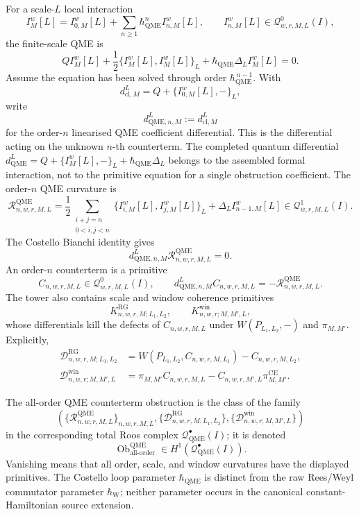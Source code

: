 \begin{defn}
For a scale-\(L\) local interaction
\[
  I^w_M[L]
  =
  I^w_{0,M}[L]
  +\sum_{n\ge1}\hbar_{\mathrm{QME}}^n I^w_{n,M}[L],
  \qquad
  I^w_{n,M}[L]\in\mathcal Q^0_{w,r,M,L}(I),
\]
the finite-scale QME is
\[
  QI^w_M[L]
  +\frac12\{I^w_M[L],I^w_M[L]\}_L
  +\hbar_{\mathrm{QME}}\Delta_LI^w_M[L]=0 .
\]
Assume the equation has been solved through order
\(\hbar_{\mathrm{QME}}^{\,n-1}\).  With
\[
  d^{L}_{\mathrm{cl},M}
  =
  Q+\{I^w_{0,M}[L],-\}_L ,
\]
write
\[
  d^{L}_{\mathrm{QME},n,M}:=d^{L}_{\mathrm{cl},M}
\]
for the order-\(n\) linearised QME coefficient differential.  This is
the differential acting on the unknown \(n\)-th counterterm.  The
completed quantum differential
\(d_{\mathrm{QME}}^{L}=Q+\{I^w_M[L],-\}_L+\hbar_{\mathrm{QME}}\Delta_L\)
belongs to the assembled formal interaction, not to the primitive
equation for a single obstruction coefficient.
The order-\(n\) QME curvature is
\[
  \mathcal R^{\mathrm{QME}}_{n,w,r,M,L}
  =
  \frac12
  \sum_{\substack{i+j=n\\0<i,j<n}}
  \{I^w_{i,M}[L],I^w_{j,M}[L]\}_L
  +\Delta_LI^w_{n-1,M}[L]
  \in\mathcal Q^1_{w,r,M,L}(I).
\]
The Costello Bianchi identity gives
\[
  d^{L}_{\mathrm{QME},n,M}
  \mathcal R^{\mathrm{QME}}_{n,w,r,M,L}=0 .
\]
An order-\(n\) counterterm is a primitive
\[
  C_{n,w,r,M,L}\in\mathcal Q^0_{w,r,M,L}(I),
  \qquad
  d^{L}_{\mathrm{QME},n,M}C_{n,w,r,M,L}
  =-\mathcal R^{\mathrm{QME}}_{n,w,r,M,L}.
\]
The tower also contains scale and window coherence primitives
\[
  K^{\mathrm{RG}}_{n,w,r,M;L_1,L_2},\qquad
  K^{\mathrm{win}}_{n,w,r;M,M',L},
\]
whose differentials kill the defects of \(C_{n,w,r,M,L}\) under
\(W(P_{L_1,L_2},-)\) and \(\pi_{M,M'}\).
Explicitly,
\[
  \begin{aligned}
  \mathcal D^{\mathrm{RG}}_{n,w,r,M;L_1,L_2}
  &=
  W(P_{L_1,L_2},C_{n,w,r,M,L_1})-C_{n,w,r,M,L_2},\\
  \mathcal D^{\mathrm{win}}_{n,w,r;M,M',L}
  &=
  \pi_{M,M'}C_{n,w,r,M,L}
  -C_{n,w,r,M',L}\pi^{\mathrm{CE}}_{M,M'} .
  \end{aligned}
\]

The all-order QME counterterm obstruction is the class of the family
\[
  \left(
  \{\mathcal R^{\mathrm{QME}}_{n,w,r,M,L}\}_{n,w,r,M,L},
  \{\mathcal D^{\mathrm{RG}}_{n,w,r,M;L_1,L_2}\},
  \{\mathcal D^{\mathrm{win}}_{n,w,r;M,M',L}\}
  \right)
\]
in the corresponding total Roos complex
\(\mathcal Q^\bullet_{\mathrm{QME}}(I)\); it is denoted
\[
  \operatorname{Ob}^{\mathrm{QME}}_{\mathrm{all\mbox{-}order}}
  \in H^1(\mathcal Q^\bullet_{\mathrm{QME}}(I)).
\]
Vanishing means that all order, scale, and window curvatures have the
displayed primitives.  The Costello loop parameter
\(\hbar_{\mathrm{QME}}\) is distinct from the raw Rees/Weyl commutator
parameter \(\hbar_{\mathrm{W}}\); neither parameter occurs in the
canonical constant-Hamiltonian source extension.
\end{defn}

